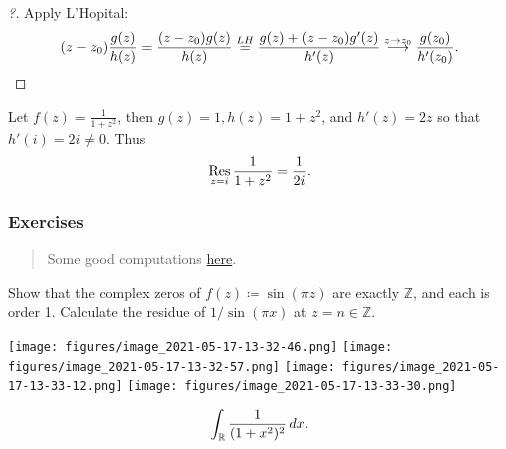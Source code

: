 \begin{proof}[?]

Apply L'Hopital:
\begin{align*}
(z-z_0) {g(z) \over h(z)} = {(z-z_0) g(z) \over h(z) } \overset{LH}{=}
{g(z) + (z-z_0) g'(z) \over h'(z)} \overset{z\to z_0}\longrightarrow{g(z_0) \over h'(z_0)}
.\end{align*}

\end{proof}

\begin{example}

Let \(f(z) = \frac{1}{1+z^2}\), then \(g(z) = 1, h(z) = 1+z^2\), and
\(h'(z) = 2z\) so that \(h'(i) = 2i \neq 0\). Thus
\begin{align*}
\mathop{\mathrm{Res}}_{z=i}{1\over 1+z^2} = \frac{1}{2i}
.\end{align*}

\end{example}

\hypertarget{exercises-3}{%
\subsubsection{Exercises}\label{exercises-3}}

\begin{quote}
Some good computations
\href{https://math.mit.edu/~jorloff/18.04/notes/topic9.pdf}{here}.
\end{quote}

\begin{exercise}

Show that the complex zeros of \(f(z) \coloneqq\sin(\pi z)\) are exactly
\({\mathbb{Z}}\), and each is order 1. Calculate the residue of
\(1/\sin(\pi x)\) at \(z=n\in {\mathbb{Z}}\).

\end{exercise}

\texttt{[image: figures/image\_2021-05-17-13-32-46.png]}
\texttt{[image: figures/image\_2021-05-17-13-32-57.png]}
\texttt{[image: figures/image\_2021-05-17-13-33-12.png]}
\texttt{[image: figures/image\_2021-05-17-13-33-30.png]}

\begin{exercise}[?]

\begin{align*}
\int_{\mathbb{R}}{1 \over (1+x^2)^2} \,dx
.\end{align*}

\end{exercise}

